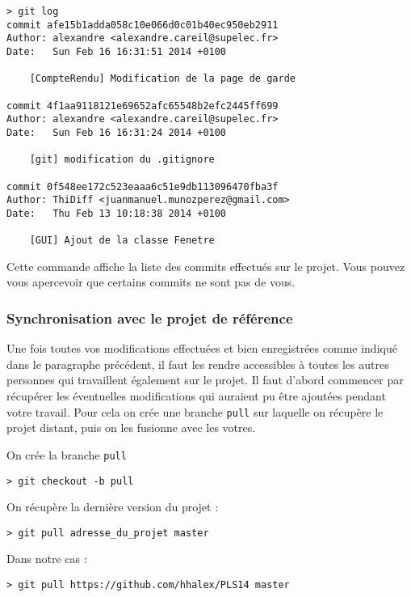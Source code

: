 \begin{verbatim}
> git log
commit afe15b1adda058c10e066d0c01b40ec950eb2911
Author: alexandre <alexandre.careil@supelec.fr>
Date:   Sun Feb 16 16:31:51 2014 +0100

    [CompteRendu] Modification de la page de garde

commit 4f1aa9118121e69652afc65548b2efc2445ff699
Author: alexandre <alexandre.careil@supelec.fr>
Date:   Sun Feb 16 16:31:24 2014 +0100

    [git] modification du .gitignore

commit 0f548ee172c523eaaa6c51e9db113096470fba3f
Author: ThiDiff <juanmanuel.munozperez@gmail.com>
Date:   Thu Feb 13 10:18:38 2014 +0100

    [GUI] Ajout de la classe Fenetre
\end{verbatim}


\par Cette commande affiche la liste des commits effectués sur le projet. Vous pouvez vous apercevoir que certains commits ne sont pas de vous.

\subsubsection{Synchronisation avec le projet de référence}
\label{sec:synchr-avec-le}

\par Une fois toutes vos modifications effectuées et bien enregistrées comme indiqué dans le paragraphe précédent, il faut les rendre accessibles à toutes les autres personnes qui travaillent également sur le projet. Il faut d'abord commencer par récupérer les éventuelles modifications qui auraient pu être ajoutées pendant votre travail. Pour cela on crée une branche \texttt{pull} sur laquelle on récupère le projet distant, puis on les fusionne avec les votres.

\par On crée la branche \texttt{pull}
\begin{verbatim}
> git checkout -b pull
\end{verbatim}

\par On récupère la dernière version du projet :
\begin{verbatim}
> git pull adresse_du_projet master
\end{verbatim}

\par Dans notre cas :
\begin{verbatim}
> git pull https://github.com/hhalex/PLS14 master
\end{verbatim}

